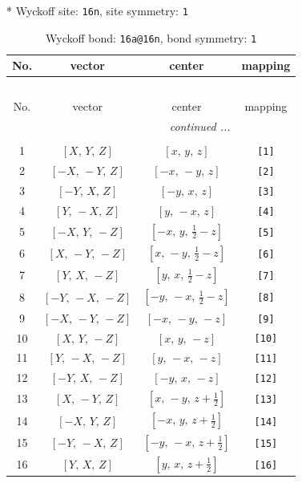 \documentclass[fleqn,8pt]{jsarticle}
\begin{document}
* Wyckoff site: {\tt 16n}, site symmetry: {\tt 1}
\renewcommand{\arraystretch}{1.2}
\begin{longtable}{cccc}
\caption{Wyckoff bond: {\tt 16a@16n}, bond symmetry: {\tt 1}}
 \\
 \hline \hline
No. & vector & center & mapping \\ \hline \endfirsthead

\multicolumn{3}{l}{\tablename\ \thetable{}} \\
 \hline \hline
No. & vector & center & mapping \\ \hline \endhead

 \hline \hline
\multicolumn{3}{r}{\footnotesize\it continued ...} \\ \endfoot

 \hline \hline
\multicolumn{3}{r}{} \\ \endlastfoot

1 & $\left[ X,\, Y,\, Z \right]$ & $\left[ x,\, y,\, z \right]$ & {\tt [1]} \\ \hline
2 & $\left[ - X,\, - Y,\, Z \right]$ & $\left[ - x,\, - y,\, z \right]$ & {\tt [2]} \\ \hline
3 & $\left[ - Y,\, X,\, Z \right]$ & $\left[ - y,\, x,\, z \right]$ & {\tt [3]} \\ \hline
4 & $\left[ Y,\, - X,\, Z \right]$ & $\left[ y,\, - x,\, z \right]$ & {\tt [4]} \\ \hline
5 & $\left[ - X,\, Y,\, - Z \right]$ & $\left[ - x,\, y,\, \frac{1}{2} - z \right]$ & {\tt [5]} \\ \hline
6 & $\left[ X,\, - Y,\, - Z \right]$ & $\left[ x,\, - y,\, \frac{1}{2} - z \right]$ & {\tt [6]} \\ \hline
7 & $\left[ Y,\, X,\, - Z \right]$ & $\left[ y,\, x,\, \frac{1}{2} - z \right]$ & {\tt [7]} \\ \hline
8 & $\left[ - Y,\, - X,\, - Z \right]$ & $\left[ - y,\, - x,\, \frac{1}{2} - z \right]$ & {\tt [8]} \\ \hline
9 & $\left[ - X,\, - Y,\, - Z \right]$ & $\left[ - x,\, - y,\, - z \right]$ & {\tt [9]} \\ \hline
10 & $\left[ X,\, Y,\, - Z \right]$ & $\left[ x,\, y,\, - z \right]$ & {\tt [10]} \\ \hline
11 & $\left[ Y,\, - X,\, - Z \right]$ & $\left[ y,\, - x,\, - z \right]$ & {\tt [11]} \\ \hline
12 & $\left[ - Y,\, X,\, - Z \right]$ & $\left[ - y,\, x,\, - z \right]$ & {\tt [12]} \\ \hline
13 & $\left[ X,\, - Y,\, Z \right]$ & $\left[ x,\, - y,\, z + \frac{1}{2} \right]$ & {\tt [13]} \\ \hline
14 & $\left[ - X,\, Y,\, Z \right]$ & $\left[ - x,\, y,\, z + \frac{1}{2} \right]$ & {\tt [14]} \\ \hline
15 & $\left[ - Y,\, - X,\, Z \right]$ & $\left[ - y,\, - x,\, z + \frac{1}{2} \right]$ & {\tt [15]} \\ \hline
16 & $\left[ Y,\, X,\, Z \right]$ & $\left[ y,\, x,\, z + \frac{1}{2} \right]$ & {\tt [16]} \\
\end{longtable}
\end{document}

